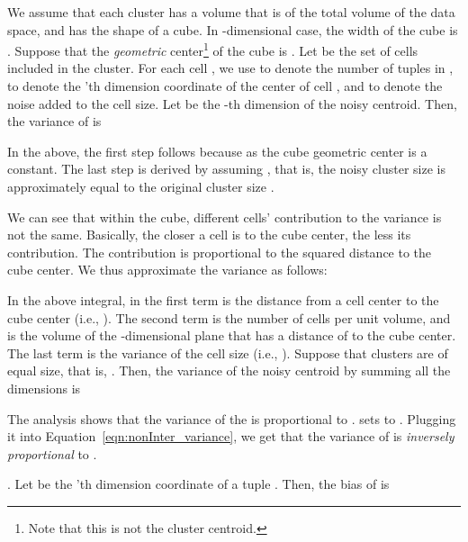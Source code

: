  We assume that each cluster has a volume that is  of the total volume of the data space, and has the shape of a cube. In -dimensional case, the width of the cube is . Suppose that the {\em geometric} center\footnote{Note that this is not the cluster centroid.} of the cube is . Let  be the set of cells included in the cluster. For each cell , we use  to denote the number of tuples in ,  to denote the 'th dimension coordinate of the center of cell , and  to denote the noise added to the cell size.  Let  be the -th dimension of the noisy centroid. Then, the variance of  is

In the above, the first step follows because  as the cube geometric center is a constant. The last step is derived by assuming , that is, the noisy cluster size is approximately equal to the original cluster size .

We can see that within the cube, different cells' contribution to the variance is not the same.  Basically, the closer a cell is to the cube center, the less its contribution. The contribution is proportional to the squared distance to the cube center. We thus approximate the variance as follows:

In the above integral,  in the first term is the distance from a cell center to the cube center (i.e., ). The second term  is the number of cells per unit volume, and  is the volume of the -dimensional plane that has a distance of  to the cube center. The last term  is the variance of the cell size (i.e., ). Suppose that clusters are of equal size, that is, . Then, the variance of the noisy centroid by summing all the  dimensions  is


The analysis shows that the variance of the \eugkm is proportional to .  \eugkm sets  to .  Plugging it into Equation~\ref{eqn:nonInter_variance}, we get that the variance of \eugkm is \emph{inversely proportional} to .

\begin{comment}
The analysis shows that the variance of non-interactive approach is proportional to .
\eugkm sets  to , and MkM sets , respectively. 
Plugging them into Equation~\ref{eqn:nonInter_variance}, it follows that the variance of \eugkm is \emph{inversely proportional} to .
  while that of \mkm is \emph{inversely proportional} to . This gives a reason why \eugkm performs much better than \mkm for small  values (Figure \ref{fig:non-interactive_VS_interactive}). \end{comment}
.
Let  be the 'th dimension coordinate of a tuple . Then, the bias of  is


